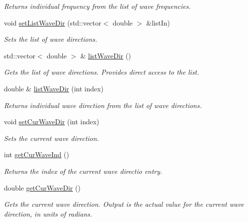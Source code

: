 \begin{DoxyCompactItemize}
\begin{DoxyCompactList}\small\item\em Returns individual frequency from the list of wave frequencies. \end{DoxyCompactList}\item 
void \hyperlink{classosea_1_1ofreq_1_1_outputs_body_aec7bf6b2bb30646a4f45045810265d84}{set\-List\-Wave\-Dir} (std\-::vector$<$ double $>$ \&list\-In)
\begin{DoxyCompactList}\small\item\em Sets the list of wave directions. \end{DoxyCompactList}\item 
std\-::vector$<$ double $>$ \& \hyperlink{classosea_1_1ofreq_1_1_outputs_body_a710a66d19fb8ba5a6c9c15e0143f832e}{list\-Wave\-Dir} ()
\begin{DoxyCompactList}\small\item\em Gets the list of wave directions. Provides direct access to the list. \end{DoxyCompactList}\item 
double \& \hyperlink{classosea_1_1ofreq_1_1_outputs_body_abc0b04ccd535145e9c9528cde8cd4d15}{list\-Wave\-Dir} (int index)
\begin{DoxyCompactList}\small\item\em Returns individual wave direction from the list of wave directions. \end{DoxyCompactList}\item 
void \hyperlink{classosea_1_1ofreq_1_1_outputs_body_a7d2b93ecaf1fa39257444bdf3194eacc}{set\-Cur\-Wave\-Dir} (int index)
\begin{DoxyCompactList}\small\item\em Sets the current wave direction. \end{DoxyCompactList}\item 
int \hyperlink{classosea_1_1ofreq_1_1_outputs_body_acac6b220f8d472d3cc7e9102022c88ff}{get\-Cur\-Wave\-Ind} ()
\begin{DoxyCompactList}\small\item\em Returns the index of the current wave directio entry. \end{DoxyCompactList}\item 
double \hyperlink{classosea_1_1ofreq_1_1_outputs_body_a21deeef0aaace27fa376c6222bc8b0a4}{get\-Cur\-Wave\-Dir} ()
\begin{DoxyCompactList}\small\item\em Gets the current wave direction. Output is the actual value for the current wave direction, in units of radians. \end{DoxyCompactList}\item 

\end{DoxyCompactItemize}
